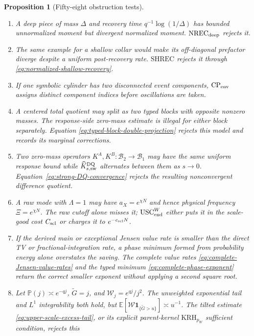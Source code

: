 \documentclass[11pt]{article}
\newtheorem{proposition}[theorem]{Proposition}
\newcommand{\cB}{\mathcal B}
\newcommand{\one}{\mathbf 1}
\begin{document}
\begin{proposition}[Fifty-eight obstruction tests]
\begin{enumerate}[label=\textup{(T\arabic*)}]
      the latter and never infers it from signed TV.
\item A deep piece of mass $\Delta$ and recovery time
      $q^{-1}\log(1/\Delta)$ has bounded unnormalized moment but divergent
      normalized moment.  $\mathrm{NREC}_{\rm deep}$ rejects it.
\item The same example for a shallow collar would make its off-diagonal
      prefactor diverge despite a uniform post-recovery rate.
      $\mathrm{SHREC}$ rejects it through
      \eqref{eq:normalized-shallow-recovery}.
\item If one symbolic cylinder has two disconnected event components,
      $\mathrm{CP}_{\rm env}$ assigns distinct component indices before
      oscillations are taken.
\item A centered total quotient may split as two typed blocks with opposite
      nonzero masses.  The response-side zero-mass estimate is illegal for
      either block separately.  Equation
      \eqref{eq:typed-block-double-projection} rejects this model and records
      its marginal corrections.
\item Two zero-mass operators $K^A,K^B:\cB_2\to\cB_1$ may have the same
      uniform response bound while
      $\widehat K_{s,\rm sw}^{\rm DQ}$ alternates between them as $s\to0$.
      Equation~\eqref{eq:strong-DQ-convergence} rejects the resulting
      nonconvergent difference quotient.
\item A raw mode with $\Lambda=1$ may have $a_X=e^{\chi N}$ and hence
      physical frequency $\Xi=e^{\chi N}$.  The raw cutoff alone misses it;
      $\mathrm{USC}_{\rm end}^{W}$ either puts it in the scale-good cost
      $C_{\rm scl}$ or charges it to $e^{-c_{\rm scl}N}$.
\item If the derived main or exceptional Jensen value rate is smaller than
      the direct TV or fractional-integration rate, a phase minimum formed
      from probability energy alone overstates the saving.  The complete
      value rates \eqref{eq:complete-Jensen-value-rates} and the typed
      minimum \eqref{eq:complete-phase-exponent} return the correct smaller
      exponent without applying a second square root.
\item Let $\mathbb P(j)\asymp e^{-qj}$,
      $\widetilde G=j$, and $\mathscr W_j=e^{qj}/j^2$.  The unweighted
      exponential tail and $L^1$ integrability both hold, but
      $\mathbb E[\mathscr W\one_{\{\widetilde G>u\}}]\asymp u^{-1}$.
      The tilted estimate \eqref{eq:upper-scale-excess-tail}, or its explicit
      parent-kernel $\mathrm{KRH}_{p_W}$ sufficient condition, rejects this

\end{enumerate}
\end{proposition}
\end{document}
